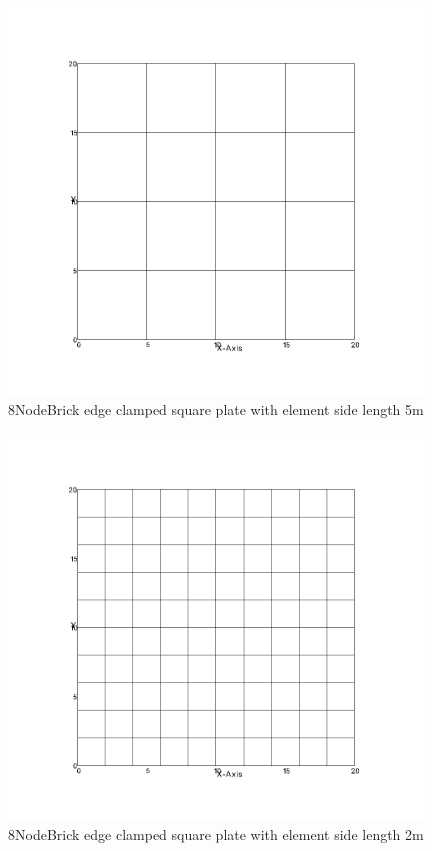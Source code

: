\documentclass[fleqn,11pt,letter]{article}
\begin{document}
\newpage

\begin{figure}[H]
  \centering
  \includegraphics[width=11cm]{../Figure_files/8NodeBrick/square_plate2.png}
  \caption{8NodeBrick edge clamped square plate with element side length 5m }
  \label{fig 8NodeBrick edges clamped square plate with element side length 5m }
\end{figure}


\begin{figure}[H]
  \centering
  \includegraphics[width=11cm]{../Figure_files/8NodeBrick/square_plate3.png}
  \caption{8NodeBrick edge clamped square plate with element side length 2m }
  \label{fig 8NodeBrick edges clamped square plate with element side length 2m }
\end{figure}
\end{document}
